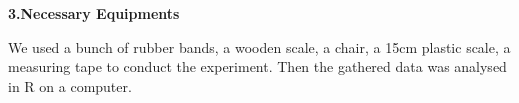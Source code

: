 \begin{center}
\textbf{{\huge 3.Necessary Equipments}}
\end{center}
\vspace{ 2 mm}
We used a bunch of rubber bands, a wooden scale, a chair, a 15cm plastic scale, a measuring tape to conduct the experiment. Then the gathered data was analysed in R on a computer.\newline
